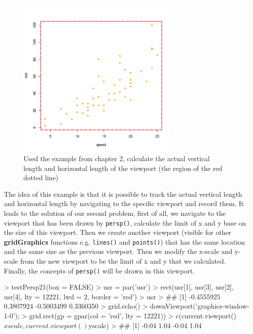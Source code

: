 \documentclass{report}
\begin{document}
\begin{figure}[h]
	\begin{center}
		\includegraphics[height = 8cm, width = 8cm]{figure/gridGraphics_persp_demo_1.pdf}
		\caption{Used the example from chapter 2, calculate the actual vertical length and horizontal length of the viewport (the region of the red dotted line)}
		\label{figure_4.2}
	\end{center}
\end{figure}

\newpage
The idea of this example is that it is possible to track the actual vertical length and horizontal length by navigating to the specific viewport and record them. It leads to the solution of our second problem, first of all, we navigate to the viewport that has been drawn by \texttt{persp()}, calculate the limit of x and y base on the size of this viewport. Then we create another viewport (visible for other \textbf{gridGraphics} functions e.g. \texttt{lines()} and \texttt{points()}) that has the same location and the same size as the previous viewport. Then we modify the x-scale and y-scale from the new viewport to be the limit of x and y that we calculated. Finally, the concepts of \texttt{persp()} will be drawn in this viewport. \\

\begin{Schunk}
\begin{Sinput}
> testPersp21(box = FALSE)
> usr = par('usr')
> rect(usr[1], usr[3], usr[2], usr[4], lty = 12221, lwd = 2, border = 'red')
> usr
> ## [1] -0.4555925  0.3807924 -0.5003499  0.3360350
> grid.echo()
> downViewport('graphics-window-1-0'); 
> grid.rect(gp = gpar(col = 'red', lty = 12221))
> c(current.viewport()$xscale, current.viewport()$yscale)
> ## [1] -0.04  1.04 -0.04  1.04
\end{Sinput}
\end{Schunk}
\end{document}
